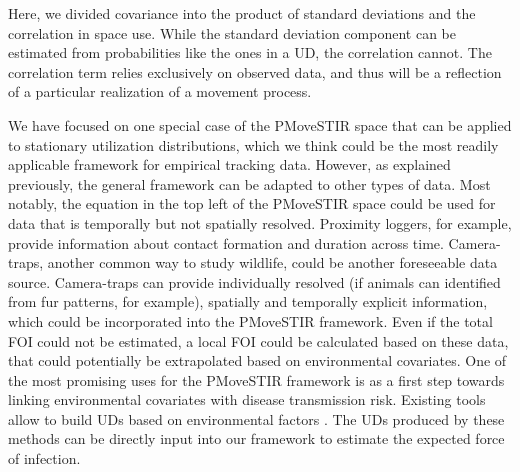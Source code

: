 \documentclass[letterpaper]{article}
\begin{document}
Here, we divided covariance into the product of standard deviations and the correlation in space use. While the standard deviation component can be estimated from probabilities like the ones in a UD, the correlation cannot. The correlation term relies exclusively on observed data, and thus will be a reflection of a particular realization of a movement process. 



We have focused on one special case of the PMoveSTIR space that can be applied to stationary utilization distributions, which we think could be the most readily applicable framework for empirical tracking data. 
However, as explained previously, the general framework can be adapted to other types of data. Most notably, the equation in the top left of the PMoveSTIR space could be used for data that is temporally but not spatially resolved. Proximity loggers, for example, provide information about contact formation and duration across time. 
Camera-traps, another common way to study wildlife, could be another foreseeable data source. Camera-traps can provide individually resolved (if animals can identified from fur patterns, for example), spatially and temporally explicit information, which could be incorporated into the PMoveSTIR framework. Even if the total FOI could not be estimated, a local FOI could be calculated based on these data, that could potentially be extrapolated based on environmental covariates. 
One of the most promising uses for the PMoveSTIR framework is as a first step towards linking environmental covariates with disease transmission risk. 
Existing tools allow to build UDs based on environmental factors \citep{Signer2017,Michelot2020}. The UDs produced by these methods can be directly input into our framework to estimate the expected force of infection.




\end{document}
